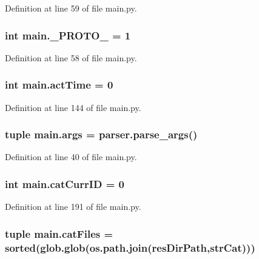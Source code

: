 Definition at line 59 of file main.\-py.

\hypertarget{a00117_afe92b072adc360963093d3660e7684ce}{
\subsubsection[{\-\_\-\-P\-R\-O\-T\-O\-\_\-}]{\setlength{\rightskip}{0pt plus 5cm}int main.\-\_\-\-P\-R\-O\-T\-O\-\_\- = 1}}\label{a00117_afe92b072adc360963093d3660e7684ce}


Definition at line 58 of file main.\-py.

\hypertarget{a00117_a9c2013c88f8354ccf6504c51843f1d5e}{
\subsubsection[{act\-Time}]{\setlength{\rightskip}{0pt plus 5cm}int main.\-act\-Time = 0}}\label{a00117_a9c2013c88f8354ccf6504c51843f1d5e}


Definition at line 144 of file main.\-py.

\hypertarget{a00117_a80760a53c8941c6f6f30e633649ffd8d}{
\subsubsection[{args}]{\setlength{\rightskip}{0pt plus 5cm}tuple main.\-args = parser.\-parse\-\_\-args()}}\label{a00117_a80760a53c8941c6f6f30e633649ffd8d}


Definition at line 40 of file main.\-py.

\hypertarget{a00117_aa56c55225fa65fa569bd8d5f1063550e}{
\subsubsection[{cat\-Curr\-I\-D}]{\setlength{\rightskip}{0pt plus 5cm}int main.\-cat\-Curr\-I\-D = 0}}\label{a00117_aa56c55225fa65fa569bd8d5f1063550e}


Definition at line 191 of file main.\-py.

\hypertarget{a00117_a189dc9cf606d870dacab059d5e7dca24}{
\subsubsection[{cat\-Files}]{\setlength{\rightskip}{0pt plus 5cm}tuple main.\-cat\-Files = sorted(glob.\-glob(os.\-path.\-join({\bf res\-Dir\-Path},{\bf str\-Cat})))}}\label{a00117_a189dc9cf606d870dacab059d5e7dca24}


